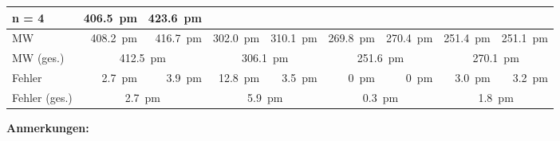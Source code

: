 \begin{table}[h!]
\begin{tabular}{lrrrrrrrr}
        n = 4                   &
        \SI{406.5}{\pico\meter} & %
        \SI{423.6}{\pico\meter} & %
                                &
                                &
                                &
                                &
                                &
                                \\

		\midrule

        MW             &
        \SI{408.2}{\pico\meter} &
        \SI{416.7}{\pico\meter} &
        \SI{302.0}{\pico\meter} &
        \SI{310.1}{\pico\meter} &
        \SI{269.8}{\pico\meter} &
        \SI{270.4}{\pico\meter} &
        \SI{251.4}{\pico\meter} &
        \SI{251.1}{\pico\meter} \\

        MW (ges.)      &
        \multicolumn{2}{c}{\SI{412.5}{\pico\meter}} &
        \multicolumn{2}{c}{\SI{306.1}{\pico\meter}} &
        \multicolumn{2}{c}{\SI{251.6}{\pico\meter}} &
        \multicolumn{2}{c}{\SI{270.1}{\pico\meter}} \\

		\midrule

        Fehler         &
         \SI{2.7}{\pico\meter} &
         \SI{3.9}{\pico\meter} &
        \SI{12.8}{\pico\meter} &
         \SI{3.5}{\pico\meter} &
         \SI{0}{\pico\meter} &
         \SI{0}{\pico\meter} &
         \SI{3.0}{\pico\meter} &
         \SI{3.2}{\pico\meter} \\

        Fehler (ges.)    &
        \multicolumn{2}{c}{\SI{2.7}{\pico\meter}} &
        \multicolumn{2}{c}{\SI{5.9}{\pico\meter}} &
        \multicolumn{2}{c}{\SI{0.3}{\pico\meter}} &
        \multicolumn{2}{c}{\SI{1.8}{\pico\meter}} \\

        \bottomrule
    \end{tabular}
\end{table}

\textbf{Anmerkungen:}


